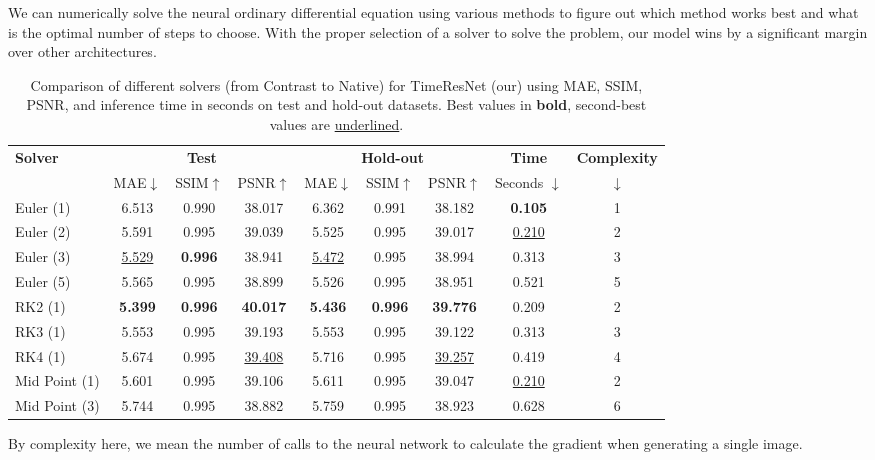 \documentclass{article}
\begin{document}
We can numerically solve the neural ordinary differential equation using various methods to figure out which method works best and what is the optimal number of steps to choose. With the proper selection of a solver to solve the problem, our model wins by a significant margin over other architectures.

\begin{table}[h!]
\centering
\label{tab:solver}
\begin{tabular}{l ccc ccc cc}
\toprule
\textbf{Solver} 
  & \multicolumn{3}{c}{\textbf{Test}} 
  & \multicolumn{3}{c}{\textbf{Hold-out}} 
  & \textbf{Time} & \textbf{Complexity} \\
\cmidrule(lr){2-4} \cmidrule(lr){5-7} 
  & MAE$\downarrow$ & SSIM$\uparrow$ & PSNR$\uparrow$ 
  & MAE$\downarrow$ & SSIM$\uparrow$ & PSNR$\uparrow$ 
  & Seconds $\downarrow$ & $\downarrow$ \\
\midrule
Euler (1)      & 6.513 & 0.990 & 38.017 & 6.362 & 0.991 & 38.182 & \textbf{0.105} & 1 \\
Euler (2)      & 5.591 & 0.995 & 39.039 & 5.525 & 0.995 & 39.017 & \underline{0.210} & 2 \\
Euler (3)      & \underline{5.529} & \textbf{0.996} & 38.941 & \underline{5.472} & 0.995 & 38.994 & 0.313 & 3 \\
Euler (5)      & 5.565 & 0.995 & 38.899 & 5.526 & 0.995 & 38.951 & 0.521 & 5 \\
RK2   (1)      & \textbf{5.399} & \textbf{0.996} & \textbf{40.017} & \textbf{5.436} & \textbf{0.996} & \textbf{39.776} & 0.209 & 2 \\
RK3   (1)      & 5.553 & 0.995 & 39.193 & 5.553 & 0.995 & 39.122 & 0.313 & 3 \\
RK4   (1)      & 5.674 & 0.995 & \underline{39.408} & 5.716 & 0.995 & \underline{39.257} & 0.419 & 4 \\
Mid Point (1)  & 5.601 & 0.995 & 39.106 & 5.611 & 0.995 & 39.047 & \underline{0.210} & 2 \\
Mid Point (3)  & 5.744 & 0.995 & 38.882 & 5.759 & 0.995 & 38.923 & 0.628 & 6 \\
\bottomrule
\end{tabular}
\caption{Comparison of different solvers (from Contrast to Native) for TimeResNet (our) using MAE, SSIM, PSNR, and inference time in seconds on test and hold-out datasets. Best values in \textbf{bold}, second-best values are \underline{underlined}.}
\end{table}

By complexity here, we mean the number of calls to the neural network to calculate the gradient when generating a single image.
\end{document}
